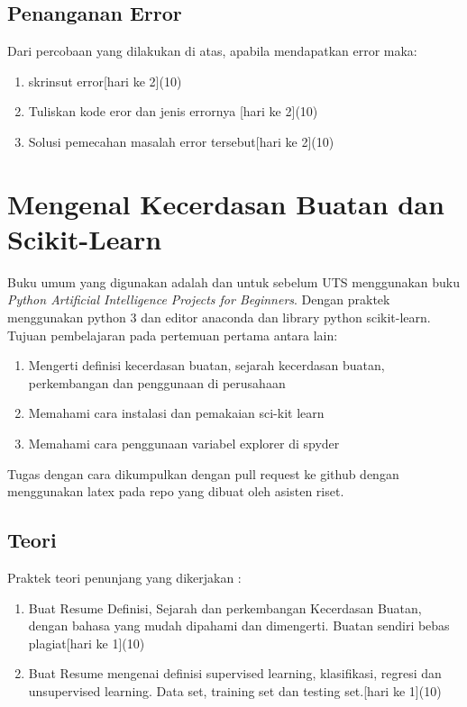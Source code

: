 \section{Penanganan Error}
Dari percobaan yang dilakukan di atas, apabila mendapatkan error maka:

\begin{enumerate}
	\item
	skrinsut error[hari ke 2](10)
	\item
Tuliskan kode eror dan jenis errornya [hari ke 2](10)
	\item
Solusi pemecahan masalah error tersebut[hari ke 2](10)

\end{enumerate}

\chapter{Mengenal Kecerdasan Buatan dan Scikit-Learn}
Buku umum yang digunakan adalah \cite{russell2016artificial} dan
untuk sebelum UTS menggunakan buku \textit{Python Artificial Intelligence Projects for Beginners}\cite{eckroth2018python}.
Dengan praktek menggunakan python 3 dan editor anaconda dan library python scikit-learn.
Tujuan pembelajaran pada pertemuan pertama antara lain:
\begin{enumerate}
\item
Mengerti definisi kecerdasan buatan, sejarah kecerdasan buatan, perkembangan dan penggunaan di perusahaan
\item
Memahami cara instalasi dan pemakaian sci-kit learn
\item
Memahami cara penggunaan variabel explorer di spyder
\end{enumerate}
Tugas dengan cara dikumpulkan dengan pull request ke github dengan menggunakan latex pada repo yang dibuat oleh asisten riset.

\section{Teori}
Praktek teori penunjang yang dikerjakan :
\begin{enumerate}
\item
Buat Resume Definisi, Sejarah dan perkembangan Kecerdasan Buatan, dengan bahasa yang mudah dipahami dan dimengerti. Buatan sendiri bebas plagiat[hari ke 1](10)
\item
Buat Resume mengenai definisi supervised learning, klasifikasi, regresi dan unsupervised learning. Data set, training set dan testing set.[hari ke 1](10)
\end{enumerate}

